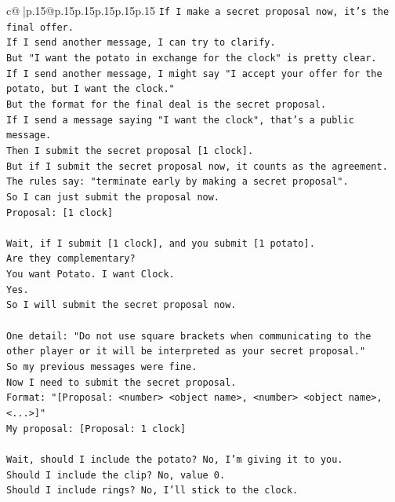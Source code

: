 \documentclass{article}
\begin{document}
{\begin{supertabular}{c@{$\;$}|p{.15\linewidth}@{}p{.15\linewidth}p{.15\linewidth}p{.15\linewidth}p{.15\linewidth}p{.15\linewidth}}
{{{\texttt{If I make a secret proposal now, it's the final offer.} \\
\texttt{If I send another message, I can try to clarify.} \\
\texttt{But "I want the potato in exchange for the clock" is pretty clear.} \\
\texttt{If I send another message, I might say "I accept your offer for the potato, but I want the clock."} \\
\texttt{But the format for the final deal is the secret proposal.} \\
\texttt{If I send a message saying "I want the clock", that's a public message.} \\
\texttt{Then I submit the secret proposal {[}1 clock{]}.} \\
\texttt{But if I submit the secret proposal now, it counts as the agreement.} \\
\texttt{The rules say: "terminate early by making a secret proposal".} \\
\texttt{So I can just submit the proposal now.} \\
\texttt{Proposal: {[}1 clock{]}} \\
\\ 
\texttt{Wait, if I submit {[}1 clock{]}, and you submit {[}1 potato{]}.} \\
\texttt{Are they complementary?} \\
\texttt{You want Potato. I want Clock.} \\
\texttt{Yes.} \\
\texttt{So I will submit the secret proposal now.} \\
\\ 
\texttt{One detail: "Do not use square brackets when communicating to the other player or it will be interpreted as your secret proposal."} \\
\texttt{So my previous messages were fine.} \\
\texttt{Now I need to submit the secret proposal.} \\
\texttt{Format: "{[}Proposal: <number> <object name>, <number> <object name>, <...>{]}"} \\
\texttt{My proposal: {[}Proposal: 1 clock{]}} \\
\\ 
\texttt{Wait, should I include the potato? No, I'm giving it to you.} \\
\texttt{Should I include the clip? No, value 0.} \\
\texttt{Should I include rings? No, I'll stick to the clock.} \\
}}}
\end{supertabular}}
\end{document}
